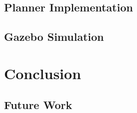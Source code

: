 \documentclass[conference]{IEEEtran} \usepackage[T1]{fontenc} \usepackage[backend=biber, style=ieee]{biblatex}
\begin{document}
\subsection{Planner Implementation} \label{Planner Implementation}

\subsection{Gazebo Simulation} \label{Gazebo Simulation}

\section{Conclusion} \label{Conclusion} 

\subsection{Future Work}

\printbibliography
\end{document}
